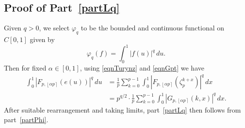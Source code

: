 \documentclass[reqno]{amsart}
\numberwithin{equation}{section}
\numberwithin{table}{section}
\numberwithin{figure}{section}
\newcommand{\abs}[1]{\left\lvert#1\right\rvert}
\newcommand{\round}[1]{\left\lfloor#1\right\rceil}
\begin{document}
\subsection{Proof of Part~\ref{partLq}}\label{subsecPartLq}
Given $q>0$, we select $\varphi_q$ to be the bounded and continuous functional on $C[0,1]$ given by
\[
\varphi_q(f) = \int_0^1 \abs{f(u)}^q\,du.
\]
Then for fixed $\alpha\in[0,1]$, using \eqref{eqnTurynz} and \eqref{eqnGpt} we have
\begin{align*}
\int_0^1 \abs{F_{p,\round{\alpha p}}(e(u))}^q\,du
&=
\frac{1}{p} \sum_{k=0}^{p-1} \int_0^1 \abs{F_{p,\round{\alpha p}}(\zeta_p^{k+x})}^q\,dx\\
&=
p^{q/2}\cdot\frac{1}{p} \sum_{k=0}^{p-1} \int_0^1 \abs{G_{p,\round{\alpha p}}(k,x)}^q\,dx.
\end{align*}
After suitable rearrangement and taking limits,  part~\ref{partLq} then follows from part~\ref{partPhi}.
\end{document}

